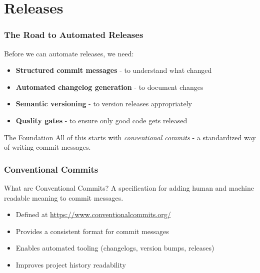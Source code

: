 \section{Releases}
{   
}

\begin{frame}
	\frametitle{The Road to Automated Releases}
	Before we can automate releases, we need:
	\begin{itemize}[<+->]
		\item \textbf{Structured commit messages} - to understand what changed
		\item \textbf{Automated changelog generation} - to document changes		
		\item \textbf{Semantic versioning} - to version releases appropriately
		\item \textbf{Quality gates} - to ensure only good code gets released
	\end{itemize}
	\pause
	\begin{block}{The Foundation}
		{All of this starts with \emph{conventional commits} - a standardized way of writing commit messages.}
	\end{block}
\end{frame}

\begin{frame}
	\frametitle{Conventional Commits}
	\begin{block}{What are Conventional Commits?}
		{A specification for adding human and machine readable meaning to commit messages.}
	\end{block}
	\pause
	\begin{itemize}
		\item Defined at \url{https://www.conventionalcommits.org/}
		\item Provides a consistent format for commit messages
		\item Enables automated tooling (changelogs, version bumps, releases)
		\item Improves project history readability
	\end{itemize}
\end{frame}

